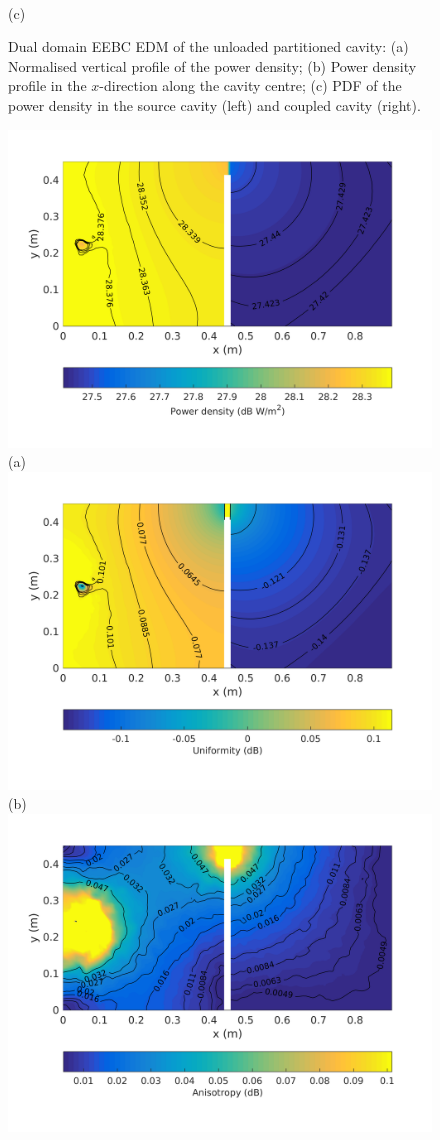 \documentclass[a4paper]{article}
\numberwithin{equation}{section}
\begin{document}
\begin{figure}[hp]
\begin{center}
\\
{\footnotesize (c)}\\
\vspace{-2mm}
\caption{\label{fg:partemptyddm_profs} Dual domain EEBC EDM of the unloaded partitioned cavity: (a) Normalised vertical profile of the power density; 
(b) Power density profile in the $x$-direction along the cavity centre; (c) PDF of the power density in the source cavity (left) and coupled cavity (right).}
\end{center}
\end{figure}

\begin{figure}[hp]
\begin{center}
\includegraphics[trim={0 8mm 0 12mm},clip,width=0.52\linewidth]{figures/DDM-EEBC_3D_DU_PowerDensityMap}\\
{\footnotesize (a)}\\
\vspace{2mm}
\includegraphics[trim={0 8mm 0 12mm},clip,width=0.52\linewidth]{figures/DDM-EEBC_3D_DU_EnergyDensityUniformityMap}\\
{\footnotesize (b)}\\
\vspace{2mm}
\includegraphics[trim={0 8mm 0 12mm},clip,width=0.52\linewidth]{figures/DDM-EEBC_3D_DU_EnergyDensityAnisotropyMap}\\

\end{center}
\end{figure}
\end{document}
